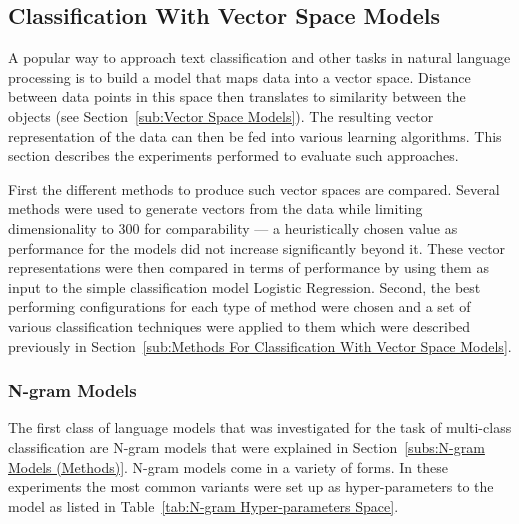 \clearpage

\subsection{Classification With Vector Space Models}
\label{sub:Classification With Vector Space Models}

A popular way to approach text classification and other tasks in natural language processing is to build a model that maps data into a vector space. Distance between data points in this space then translates to similarity between the objects (see Section~\ref{sub:Vector Space Models}).
The resulting vector representation of the data can then be fed into various learning algorithms. This section describes the experiments performed to evaluate such approaches.

First the different methods to produce such vector spaces are compared. Several methods were used to generate vectors from the data while limiting dimensionality to 300 for comparability --- a heuristically chosen value as performance for the models did not increase significantly beyond it. These vector representations were then compared in terms of performance by using them as input to the simple classification model Logistic Regression.
Second, the best performing configurations for each type of method were chosen and a set of various classification techniques were applied to them which were described previously in Section~\ref{sub:Methods For Classification With Vector Space Models}.

\subsubsection{N-gram Models}
\label{subs:N-gram Models (Experimental Results)}

The first class of language models that was investigated for the task of multi-class classification are N-gram models that were explained in Section~\ref{subs:N-gram Models (Methods)}.
N-gram models come in a variety of forms. In these experiments the most common variants were set up as hyper-parameters to the model as  listed in Table~\ref{tab:N-gram Hyper-parameters Space}.

